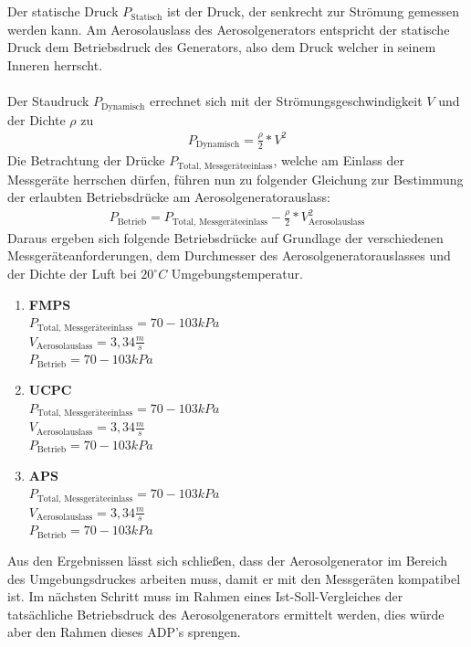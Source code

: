 \\\\
Der statische Druck \(P_\text{Statisch}\) ist der Druck, der senkrecht zur Str\"{o}mung gemessen werden kann. Am Aerosolauslass des Aerosolgenerators entspricht der statische Druck dem Betriebsdruck des Generators, also dem Druck welcher in seinem Inneren herrscht.
\\\\
Der Staudruck \(P_\text{Dynamisch}\) errechnet sich mit der Str\"{o}mungsgeschwindigkeit \(V\) und der Dichte \(\rho\) zu
\begin{align*}
	P_\text{Dynamisch} = \frac{\rho}{2} * V^2
\end{align*}
Die Betrachtung der Dr\"{u}cke \(P_\text{Total, Messger\"{a}teeinlass}\), welche am Einlass der Messger\"{a}te herrschen d\"{u}rfen, f\"{u}hren nun zu folgender Gleichung zur Bestimmung der erlaubten Betriebsdr\"{u}cke am Aerosolgeneratorauslass:
\begin{align*}
	P_\text{Betrieb} = P_\text{Total, Messger\"{a}teeinlass} - \frac{\rho}{2} * V_			\text{Aerosolauslass}^2
\end{align*}
Daraus ergeben sich folgende Betriebsdr\"{u}cke auf Grundlage der verschiedenen Messger\"{a}teanforderungen, dem Durchmesser des Aerosolgeneratorauslasses und der Dichte der Luft bei \(20^\circ C\) Umgebungstemperatur.
\begin{enumerate}
	\item \textbf{FMPS}\\
	\(P_\text{Total, Messger\"{a}teeinlass} = 70 - 103 kPa\)\\
	\(V_\text{Aerosolauslass} = 3,34 \frac{m}{s}\)\\
	\(P_\text{Betrieb} = 70 - 103 kPa\)\\
	\item \textbf{UCPC}\\
	\(P_\text{Total, Messger\"{a}teeinlass} = 70 - 103 kPa\)\\
	\(V_\text{Aerosolauslass} = 3,34 \frac{m}{s}\)\\
	\(P_\text{Betrieb} = 70 - 103 kPa\)\\
	\item \textbf{APS}\\
	\(P_\text{Total, Messger\"{a}teeinlass} = 70 - 103 kPa\)\\
	\(V_\text{Aerosolauslass} = 3,34 \frac{m}{s}\)\\
	\(P_\text{Betrieb} = 70 - 103 kPa\)
\end{enumerate} 
Aus den Ergebnissen l\"{a}sst sich schlie{\ss}en, dass der Aerosolgenerator im Bereich des Umgebungsdruckes arbeiten muss, damit er mit den Messger\"{a}ten kompatibel ist. Im n\"{a}chsten Schritt muss im Rahmen eines Ist-Soll-Vergleiches der tats\"{a}chliche Betriebsdruck des Aerosolgenerators ermittelt werden, dies w\"{u}rde aber den Rahmen dieses ADP's sprengen.
